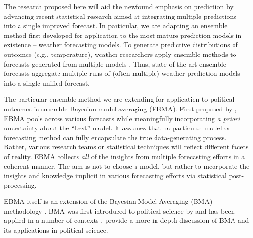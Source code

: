 \documentclass[pdftex,12pt,fullpage,oneside]{amsart}
\begin{document}
The research proposed here will aid the newfound emphasis on
prediction by advancing recent statistical research aimed at
integrating multiple predictions into a single improved forecast.  In
particular, we are adapting an ensemble method first developed for
application to the most mature prediction models in existence --
weather forecasting models.  To generate predictive distributions of
outcomes (e.g., temperature), weather researchers apply ensemble
methods to forecasts generated from multiple models
\citep{Raftery:2005}.  Thus, state-of-the-art ensemble forecasts
aggregate multiple runs of (often multiple) weather prediction models
into a single unified forecast.

The particular ensemble method we are extending for application to
political outcomes is ensemble Bayesian model averaging (EBMA). First
proposed by \citet{Raftery:2005}, EBMA pools across various forecasts
while meaningfully incorporating \textit{a priori} uncertainty about
the ``best'' model.  It assumes that no particular model or
forecasting method can fully encapsulate the true data-generating
process.  Rather, various research teams or statistical techniques
will reflect different facets of reality. EBMA collects \textit{all}
of the insights from multiple forecasting efforts in a coherent
manner.  The aim is not to choose a model, but rather to incorporate
the insights and knowledge implicit in various forecasting efforts via
statistical post-processing.

EBMA itself is an extension of the Bayesian Model Averaging (BMA)
methodology \citep[c.f.,][]{Madigan:1994, Draper:1995, Raftery:1995,
  Hoeting:1999, Clyde:2003, Raftery:2003, Clyde:2004}.  BMA was first
introduced to political science by \citet{Bartels:1997} and has been
applied in a number of contexts \citep[e.g.,][]{Bartels:2001,
  Gill:2004, Imai:2004, Geer:2006b}. \citet{Montgomery:2010c} provide
a more in-depth discussion of BMA and its applications in political
science.
\end{document}
